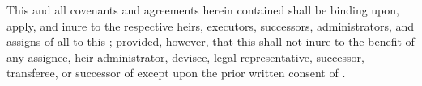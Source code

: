 This \lease and all covenants and agreements herein contained shall be binding upon, apply, and inure to the respective heirs, executors, successors, administrators, and assigns of all \parties to this \lease; provided, however, that this \lease shall not inure to the benefit of any assignee, heir administrator, devisee, legal representative, successor, transferee, or successor of \lessee except upon the prior written consent of \lessor.
